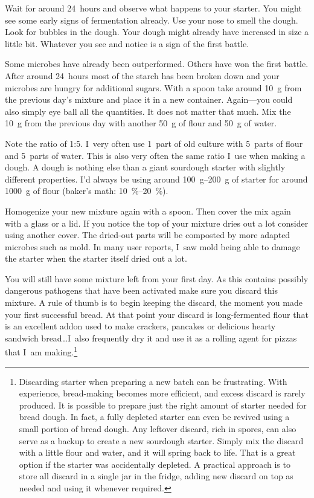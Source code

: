 Wait for around 24~hours and observe what happens to your starter.
You might see some early signs of fermentation already. Use your nose
to smell the dough. Look for bubbles in the dough. Your dough
might already have increased in size a little bit. Whatever
you see and notice is a sign of the first battle.

Some microbes have already been outperformed. Others have won the first
battle.  After around \qty{24}{hours} most of the starch has been broken down
and your microbes are hungry for additional sugars. With a spoon take around
\qty{10}{\gram} from the previous day's mixture and place it in a new
container. Again---you could also simply eye ball all the quantities. It does
not matter that much. Mix the \qty{10}{\gram} from the previous day with
another \qty{50}{\gram} of flour and \qty{50}{\gram} of water.

Note the ratio of 1:5. I~very often use
1~part of old culture with 5~parts of flour and 5~parts of water.
This is also very often the same ratio I~use when making a dough.
A dough is nothing else than a giant sourdough starter with slightly different
properties. I'd always be using around \qtyrange{100}{200}{\gram} of starter
for around \qty{1000}{\gram} of flour (baker's math: \qtyrange{10}{20}{\percent}).

Homogenize your new mixture again with a spoon. Then cover
the mix again with a glass or a lid. If you notice the top of
your mixture dries out a lot consider using another cover. The
dried-out parts will be composted by more adapted microbes such as
mold. In many user reports, I~saw mold being able to damage
the starter when the starter itself dried out a lot.

You will
still have some mixture left from your first day. As this contains
possibly dangerous pathogens that have been activated make sure you discard
this mixture. A rule of thumb is to begin keeping the discard,
the moment you made your first successful bread. At that point
your discard is long-fermented flour that is an excellent addon
used to make crackers, pancakes or delicious hearty sandwich
bread\ldots I~also frequently dry it and use it as a rolling agent
for pizzas that I~am making.\footnote{Discarding starter when preparing
a new batch can be frustrating. With experience, bread-making
becomes more efficient, and excess discard is rarely produced. It is
possible to prepare just the right amount of starter
needed for bread dough. In fact, a fully depleted starter can even be revived
using a small portion of bread dough. Any leftover discard, rich in spores,
can also serve as a backup to create a new sourdough starter. Simply mix the
discard with a little flour and water, and it will spring back to life. That is a
great option if the starter was accidentally depleted. A practical approach
is to store all discard in a single jar in the fridge, adding new discard on
top as needed and using it whenever required.}

